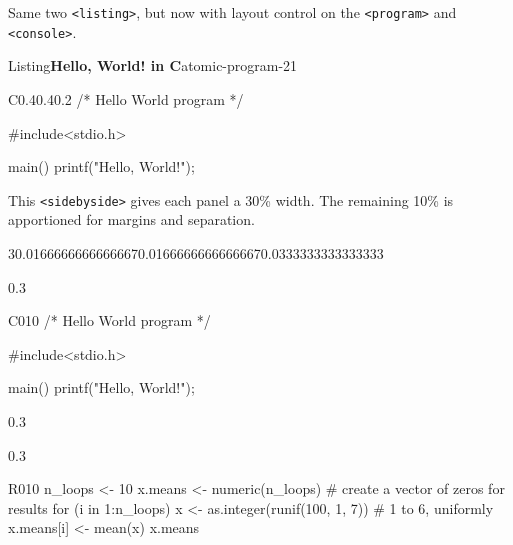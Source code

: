 \documentclass[pdflatex]{sn-jnl}
\theoremstyle{thmstyleone}%
\theoremstyle{thmstyletwo}%
\theoremstyle{thmstylethree}%
\newcommand{\mono}[1]{\texttt{#1}}
\numberwithin{equation}{section}
\newcommand{\consoleinput}[1]{\textbf{#1}}
\begin{document}
Same two \mono{<listing>}, but now with layout control on the \mono{<program>} and \mono{<console>}.%
\begin{listingptx}{Listing}{\textbf{Hello, World! in C}}{atomic-program-21}{}%
\begin{program}{C}{0.4}{0.4}{0.2}
/* Hello World program */

#include<stdio.h>

main()
{
    printf("Hello, World!");
}
\end{program}
\end{listingptx}%
%
This \mono{<sidebyside>} gives each panel a 30\% width.  The remaining 10\% is apportioned for margins and separation.%
\begin{sidebyside}{3}{0.0166666666666667}{0.0166666666666667}{0.0333333333333333}%
\begin{sbspanel}{0.3}%
\begin{program}{C}{0}{1}{0}
/* Hello World program */

#include<stdio.h>

main()
{
    printf("Hello, World!");
}
\end{program}
\end{sbspanel}%
\begin{sbspanel}{0.3}%
\end{sbspanel}%
\begin{sbspanel}{0.3}%
\begin{program}{R}{0}{1}{0}
n_loops <- 10
x.means <- numeric(n_loops)  # create a vector of zeros for results
for (i in 1:n_loops){
    x <- as.integer(runif(100, 1, 7))  # 1 to 6, uniformly
    x.means[i] <- mean(x)
}
x.means
\end{program}
\end{sbspanel}%
\end{sidebyside}%
\end{document}

